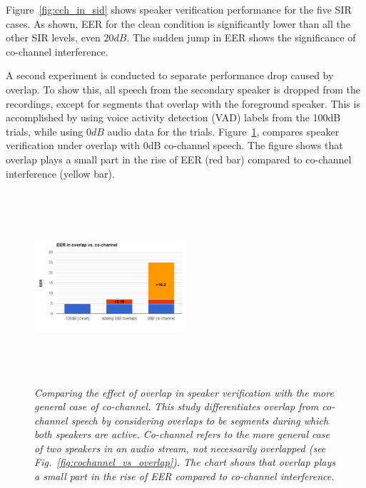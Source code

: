 Figure~\ref{fig:cch_in_sid} shows speaker verification performance for the five SIR cases. 
As shown, EER for the clean condition is significantly lower than all the other SIR levels, even $20dB$. 
The sudden jump in EER shows the significance of co-channel interference. 

A second experiment is conducted to separate performance drop caused by overlap. To show this, all speech from the secondary speaker is dropped from the recordings, except for segments that overlap with the foreground speaker. 
This is accomplished by using voice activity detection (VAD) labels from the 100dB trials, while using $0dB$ audio data for the trials. 
Figure~\ref{fig:ovl_in_sid}, compares speaker verification under overlap with 0dB co-channel speech. 
The figure shows that overlap plays a small part in the rise of EER (red bar) compared to co-channel interference (yellow bar).
\begin{figure}[h!]
	\vspace{-1mm}
	\centering
	\includegraphics[height = 2.8in, width=0.5\textwidth]{figures/overlap_vs_cochannel_sid-crop}
	\vspace{-8mm}
	\caption{\it \small Comparing the effect of overlap in speaker verification with the more general case of co-channel. This study differentiates overlap from co-channel speech by considering overlaps to be segments during which both speakers are active. Co-channel refers to the more general case of two speakers in an audio stream, not necessarily overlapped (see Fig.~\ref{fig:cochannel_vs_overlap}). The chart shows that overlap plays a small part in the rise of EER compared to co-channel interference.}
	\label{fig:ovl_in_sid}
	\vspace{-1mm}
\end{figure}

\newpage
